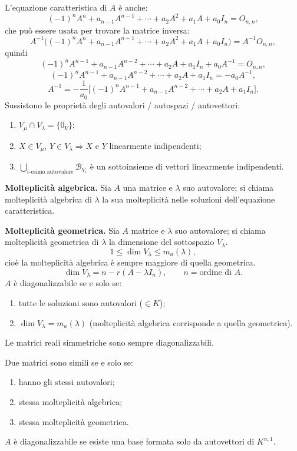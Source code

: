 \documentclass[11pt,a4paper]{article}
\newcommand{\pagina}[1]{\clearpage}
\begin{document}
\pagina{54}
L'equazione caratteristica di $A$ è anche:
\[(-1)^nA^n+a_{n-1}A^{n-1}+\cdots+a_2A^2+a_1A+a_0I_n=O_{n,n},\]
che può essere usata per trovare la matrice inversa:
\[A^{-1}\bigl((-1)^nA^n+a_{n-1}A^{n-1}+\cdots+a_2A^2+a_1A+a_0I_n\bigr)=A^{-1}O_{n,n},\]
quindi
\[(-1)^nA^{n-1}+a_{n-1}A^{n-2}+\cdots+a_2A+a_1I_n+a_0A^{-1}=O_{n,n},\]
\[(-1)^nA^{n-1}+a_{n-1}A^{n-2}+\cdots+a_2A+a_1I_n=-a_0A^{-1},\]
\[A^{-1}=-\frac1{a_0}\bigl[(-1)^nA^{n-1}+a_{n-1}A^{n-2}+\cdots+a_2A+a_1I_n\bigr].\]
Sussistono le proprietà degli autovalori / autospazi / autovettori:
\begin{enumerate}\item $V_\mu\cap V_\lambda=\{\bar0_V\}$;
\item $X\in V_\mu$, $Y\in V_\lambda\Longrightarrow X$ e $Y$ linearmente indipendenti;
\item $\displaystyle\bigcup_{i\text{-esimo autovalore}}\mathcal B_{V_i}$ è un sottoinsieme di vettori linearmente indipendenti.
\end{enumerate}
\textbf{Molteplicità algebrica.} Sia $A$ una matrice e $\lambda$ suo autovalore; si chiama molteplicità algebrica di $\lambda$ la sua molteplicità nelle soluzioni dell'equazione caratteristica.

\textbf{Molteplicità geometrica.} Sia $A$ matrice e $\lambda$ suo autovalore; si chiama molteplicità geometrica di $\lambda$ la dimensione del sottospazio $V_\lambda$.
\[1\le\dim V_\lambda\le m_a(\lambda),\]
cioè la molteplicità algebrica è sempre maggiore di quella geometrica.
\pagina{55}
\[\dim V_\lambda=n-r(A-\lambda I_n),\qquad n=\text{ordine di }A.\]
$A$ è diagonalizzabile se e solo se:
\begin{enumerate}\item tutte le soluzioni sono autovalori ($\in K$);
\item $\dim V_\lambda=m_a(\lambda)$ (molteplicità algebrica corrisponde a quella geometrica).\end{enumerate}
Le matrici reali simmetriche sono sempre diagonalizzabili.

Due matrici sono simili se e solo se:
\begin{enumerate}\item hanno gli stessi autovalori;
\item stessa molteplicità algebrica;
\item stessa molteplicità geometrica.\end{enumerate}
$A$ è diagonalizzabile se esiste una base formata solo da autovettori di $K^{n,1}$.
\end{document}
